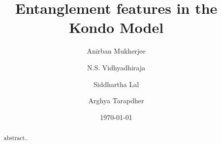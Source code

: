 \documentclass[aps,prx,preprint,groupedaddress]{revtex4-2}
\begin{document}

\title{Entanglement features in the Kondo Model}


\author{Anirban Mukherjee}
\author{N.S. Vidhyadhiraja}
\author{Siddhartha Lal}
\author{Arghya Tarapdher}



\date{\today}

\begin{abstract}
abstract..
\end{abstract}
\end{document}
